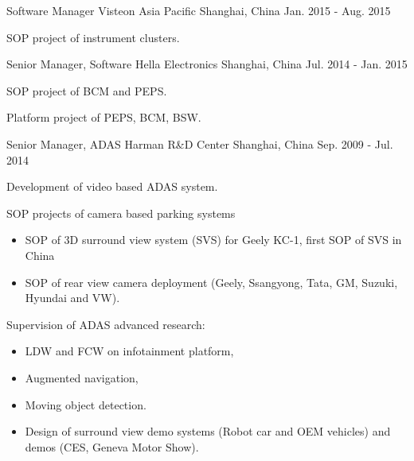 \documentclass[../cv.tex]{subfiles}
\begin{document}
\begin{cventries}
	\cventry
	{Software Manager} %
	{Visteon Asia Pacific} %
	{Shanghai, China} %
	{Jan. 2015 - Aug. 2015} %
	{
		\begin{cvitems}
			\item SOP project of instrument clusters.
		\end{cvitems}
	}

	\cventry
	{Senior Manager, Software} %
	{Hella Electronics} %
	{Shanghai, China} %
	{Jul. 2014 - Jan. 2015} %
	{
		\begin{cvitems}
			\item SOP project of BCM and PEPS.
			\item Platform project of PEPS, BCM, BSW.
		\end{cvitems}
	}

	\cventry
	{Senior Manager, ADAS} %
	{Harman R\&D Center} %
	{Shanghai, China} %
	{Sep. 2009 - Jul. 2014} %
	{
		\begin{cvitems}
			\item Development of video based ADAS system.
			\item SOP projects of camera based parking systems
			\begin{itemize}
				\item SOP of 3D surround view system (SVS) for Geely KC-1, first SOP of SVS in China
				\item SOP of rear view camera deployment (Geely, Ssangyong, Tata, GM, Suzuki, Hyundai and VW).
			\end{itemize}
			\item Supervision of ADAS advanced research:
			\begin{itemize}
				\item LDW and FCW on infotainment platform,
				\item Augmented navigation,
				\item Moving object detection.
				\item Design of surround view demo systems (Robot car and OEM vehicles) and demos (CES, Geneva Motor Show).
			\end{itemize}
		\end{cvitems}
	}
\end{cventries}
\end{document}
